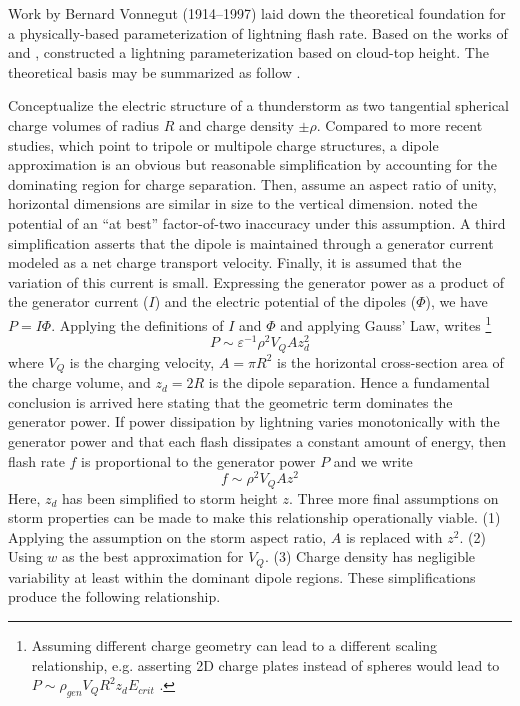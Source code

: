 	Work by Bernard Vonnegut (1914--1997) laid down the theoretical foundation for a physically-based parameterization of lightning flash rate.  Based on the works of \citet{Vonnegut:1963aa} and \citet{Williams:1985fk}, \citet{Price:1992wb} constructed a lightning parameterization based on cloud-top height. The theoretical basis may be summarized as follow \citep[after][]{Boccippio:2002uq}.

	Conceptualize the electric structure of a thunderstorm as two tangential spherical charge volumes of radius $R$ and charge density $\pm\rho$. Compared to more recent studies, which point to tripole \citep{Williams:1989uq} or multipole \citep{Stolzenburg:1998fk} charge structures, a dipole approximation is an obvious but reasonable simplification by accounting for the dominating region for charge separation. Then, assume an aspect ratio of unity, {\ie} horizontal dimensions are similar in size to the vertical dimension. \citet{Boccippio:2002uq} noted the potential of an ``at best'' factor-of-two inaccuracy under this assumption. A third simplification asserts that the dipole is maintained through a generator current modeled as a net charge transport velocity. Finally, it is assumed that the variation of this current is small.
	Expressing the generator power as a product of the generator current ($I$) and the electric potential of the dipoles ($\Phi$), we have $P = I\Phi$. Applying the definitions of $I$ and $\Phi$ and applying Gauss' Law, \citet{Boccippio:2002uq} writes \footnote{Assuming different charge geometry can lead to a different scaling relationship, e.g. asserting 2D charge plates instead of spheres would lead to $P\sim\rho_{gen}V_QR^2z_dE_{crit}$ \citep{Boccippio:2002uq}.}
	\begin{equation}\label{eqn:boccippio-P}
		P \sim \varepsilon^{-1}\rho^2V_QAz_d^2
	\end{equation}
	where $V_Q$ is the charging velocity, $A=\pi R^2$ is the horizontal cross-section area of the charge volume, and $z_d=2R$ is the dipole separation. Hence a fundamental conclusion is arrived here stating that the geometric term dominates the generator power. If power dissipation by lightning varies monotonically with the generator power and that each flash dissipates a constant amount of energy, then flash rate $f$ is proportional to the generator power $P$ and we write
	\begin{equation}\label{eqn:boccippio-f}
		f \sim \rho^2V_QAz^2
	\end{equation}
	Here, $z_d$ has been simplified to storm height $z$. Three more final assumptions on storm properties can be made to make this relationship operationally viable. (1) Applying the assumption on the storm aspect ratio, $A$ is replaced with $z^2$. (2) Using $w$ as the best approximation for $V_Q$. (3) Charge density has negligible variability at least within the dominant dipole regions. These simplifications produce the following relationship.
